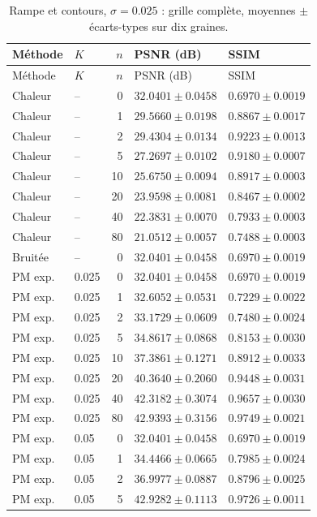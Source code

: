 \begin{longtable}{llrll}
\caption{Rampe et contours, $\sigma=0.025$ : grille complète, moyennes $\pm$ écarts-types sur dix graines.}\\
\toprule
Méthode & $K$ & $n$ & PSNR (dB) & SSIM \\
\midrule
\endfirsthead
\toprule
Méthode & $K$ & $n$ & PSNR (dB) & SSIM \\
\midrule
\endhead
\bottomrule
\endfoot
Chaleur & -- & 0 & $32.0401 \pm 0.0458$ & $0.6970 \pm 0.0019$ \\
Chaleur & -- & 1 & $29.5660 \pm 0.0198$ & $0.8867 \pm 0.0017$ \\
Chaleur & -- & 2 & $29.4304 \pm 0.0134$ & $0.9223 \pm 0.0013$ \\
Chaleur & -- & 5 & $27.2697 \pm 0.0102$ & $0.9180 \pm 0.0007$ \\
Chaleur & -- & 10 & $25.6750 \pm 0.0094$ & $0.8917 \pm 0.0003$ \\
Chaleur & -- & 20 & $23.9598 \pm 0.0081$ & $0.8467 \pm 0.0002$ \\
Chaleur & -- & 40 & $22.3831 \pm 0.0070$ & $0.7933 \pm 0.0003$ \\
Chaleur & -- & 80 & $21.0512 \pm 0.0057$ & $0.7488 \pm 0.0003$ \\
Bruitée & -- & 0 & $32.0401 \pm 0.0458$ & $0.6970 \pm 0.0019$ \\
PM exp. & 0.025 & 0 & $32.0401 \pm 0.0458$ & $0.6970 \pm 0.0019$ \\
PM exp. & 0.025 & 1 & $32.6052 \pm 0.0531$ & $0.7229 \pm 0.0022$ \\
PM exp. & 0.025 & 2 & $33.1729 \pm 0.0609$ & $0.7480 \pm 0.0024$ \\
PM exp. & 0.025 & 5 & $34.8617 \pm 0.0868$ & $0.8153 \pm 0.0030$ \\
PM exp. & 0.025 & 10 & $37.3861 \pm 0.1271$ & $0.8912 \pm 0.0033$ \\
PM exp. & 0.025 & 20 & $40.3640 \pm 0.2060$ & $0.9448 \pm 0.0031$ \\
PM exp. & 0.025 & 40 & $42.3182 \pm 0.3074$ & $0.9657 \pm 0.0030$ \\
PM exp. & 0.025 & 80 & $42.9393 \pm 0.3156$ & $0.9749 \pm 0.0021$ \\
PM exp. & 0.05 & 0 & $32.0401 \pm 0.0458$ & $0.6970 \pm 0.0019$ \\
PM exp. & 0.05 & 1 & $34.4466 \pm 0.0665$ & $0.7985 \pm 0.0024$ \\
PM exp. & 0.05 & 2 & $36.9977 \pm 0.0887$ & $0.8796 \pm 0.0025$ \\
PM exp. & 0.05 & 5 & $42.9282 \pm 0.1113$ & $0.9726 \pm 0.0011$ \\

\end{longtable}
